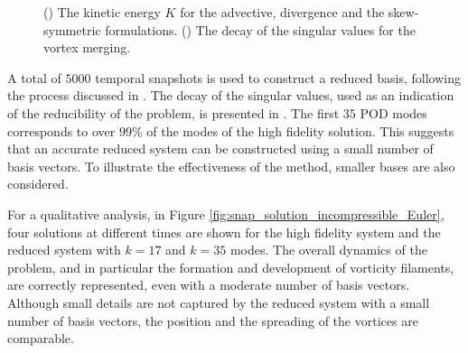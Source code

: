 \begin{figure}[t]
\begin{subfigure}[]{0.47\linewidth}
\caption{}
\label{singular_values_decay}
\end{subfigure}
  \caption{(\protect{}) The kinetic energy $K$ for the advective, divergence and the skew-symmetric formulations. (\protect{}) The decay of the singular values for the vortex merging. }
  \label{fig:unstable_full_models}
\end{figure}
A total of $5000$ temporal snapshots is used to construct a reduced basis, following the process discussed in . The decay of the singular values, used as an indication of the reducibility of the problem, is presented in . The first $35$ POD modes corresponds to over $99\%$ of the modes of the high fidelity solution. This suggests that an accurate reduced system can be constructed using a small number of basis vectors. To illustrate the effectiveness of the method, smaller bases are also considered.

For a qualitative analysis, in Figure \ref{fig:snap_solution_incompressible_Euler}, four solutions at different times are shown for the high fidelity system and the reduced system with $k=17$ and $k=35$ modes. The overall dynamics of the problem, and in particular the formation and development of vorticity filaments, are correctly represented, even with a moderate number of basis vectors. Although small details are not captured by the reduced system with a small number of basis vectors, the position and the spreading of the vortices are comparable. 

